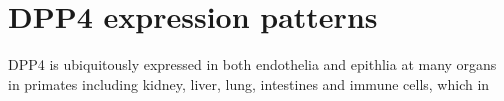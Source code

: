 \section{DPP4 expression patterns}
DPP4 is ubiquitously expressed in both endothelia and epithlia at many organs in primates including kidney, liver, lung, intestines and immune cells, which in